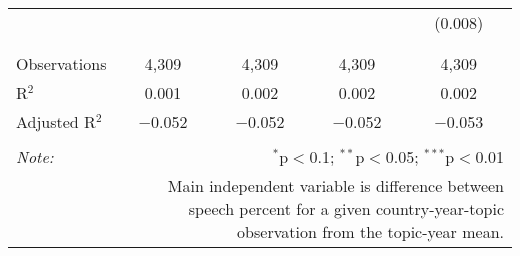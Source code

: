 \begin{table}[!htbp]
\begin{tabular}{@{\extracolsep{5pt}}lcccc}
  &  &  &  & (0.008) \\ 
  & & & & \\ 
\hline \\[-1.8ex] 
Observations & 4,309 & 4,309 & 4,309 & 4,309 \\ 
R$^{2}$ & 0.001 & 0.002 & 0.002 & 0.002 \\ 
Adjusted R$^{2}$ & $-$0.052 & $-$0.052 & $-$0.052 & $-$0.053 \\ 
\hline 
\hline \\[-1.8ex] 
\textit{Note:}  & \multicolumn{4}{r}{$^{*}$p$<$0.1; $^{**}$p$<$0.05; $^{***}$p$<$0.01} \\ 
 & \multicolumn{4}{r}{Main independent variable is difference between speech percent for a given country-year-topic observation from the topic-year mean.} \\ 
\end{tabular} 
\end{table} 
